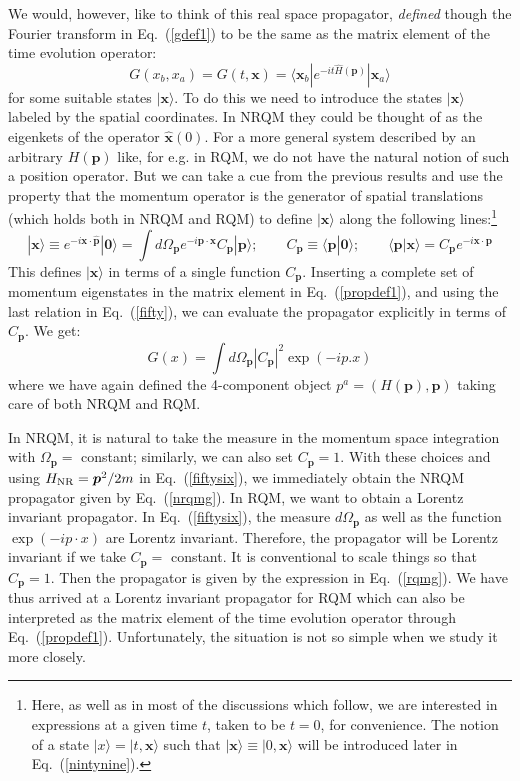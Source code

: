 \documentclass[12pt]{article}
\def\eq#1{{Eq.~(\ref{#1})}}
\def\ket#1{|#1\rangle}                    %
\def\bk#1#2#3{{\langle #1|#2|#3\rangle}}  %
\def\amp#1#2{\langle #1 | #2\rangle}      %
\begin{document}
We would, however, like to think of this real space propagator, \textit{defined} though the Fourier transform in \eq{gdef1} to be the same as the matrix element of the time evolution operator:
\begin{equation}
 G(x_b,x_a)=G(t, \bm{x}) = \bk{\bm{x}_b}{e^{-it \hat{H}(\bm{p})}}{\bm{x}_a} 
 \label{propdef1}
\end{equation}
for some suitable states $\ket{\bm{x}}$. 
  To do this we need to introduce the states $\ket{\bm{x}}$ labeled by the spatial coordinates. In NRQM they could be thought of as the eigenkets of the operator $\hat{\bm{x}}(0)$. For a more general system described by an arbitrary $H(\bm{p})$ like, for e.g. in RQM, we do not have the natural notion of such a position operator. But we can take a cue from the previous results and use
 the property that the momentum operator is the generator of spatial translations (which holds both in NRQM and RQM) to define $\ket{\bm{x}}$ along the following lines:\footnote{Here, as well as in most of the discussions which follow, we are interested in expressions at a given time $t$, taken to be $t=0$, for convenience. The notion of a state $\ket{x}=\ket{t,\bm{x}}$ such that $\ket{\bm{x}}\equiv\ket{0,\bm{x}}$ will be introduced later in
 \eq{nintynine}.}
 \begin{equation}
 \ket{ \bm{x}} \equiv e^{-i\bm{x}\cdot \hat{\bm{p}}}|\bm{0}\rangle = \int d\Omega_{ \bm{p}} e^{-i\bm{p\cdot x}}C_{ \bm{p}} |\bm{p}\rangle ; \qquad C_{ \bm{p}} \equiv \amp{\bm{p}}{\bm{0}};\qquad \amp{\bm{p}}{\bm{x}} = C_{\bm{p}} e^{-i\bm{x\cdot p}}
 \label{fifty}
\end{equation} 
 This defines $\ket{\bm{x}}$ in terms of a single function $C_{\bm{p}}$. Inserting a complete set of momentum eigenstates in the matrix element in \eq{propdef1}, and using the last relation in \eq{fifty}, we can evaluate the propagator explicitly in terms of $C_{\bm{p}}$. We get:
 \begin{equation}
 G(x) = \int d\Omega_{\bm{p}} | C_{\bm{p}}|^2 \exp(- i p.x)
 \label{fiftysix}
\end{equation} 
where we have again defined the 4-component object
$
 p^a = (H(\bm{p}), \bm{p})
$ taking care of both NRQM and RQM. 

In NRQM, it is natural to take the measure in the momentum space integration with $\Omega_{\bm{p}} =$ constant; similarly, we can also set $C_{\bm{p}}=1$. With these choices and using $H_{\rm NR} = \bm{p}^2/2m$ in \eq{fiftysix}, we immediately obtain the NRQM propagator given by \eq{nrqmg}.
In RQM, we want to obtain a Lorentz invariant propagator. In \eq{fiftysix}, the measure $d\Omega_{\bm{p}}$ as well as the function $\exp(-ip\cdot x)$ are Lorentz invariant. Therefore, the propagator will be Lorentz invariant if we take $C_{\bm{p}}=$ constant. It is conventional to scale things so that  $C_{\bm{p}}=1$. Then the propagator is given by the  expression in \eq{rqmg}.
 We have thus arrived at a Lorentz invariant propagator for RQM which can also be interpreted as the matrix element of the time evolution operator through \eq{propdef1}. Unfortunately, the situation is not so simple when we study it more closely.
\end{document}
